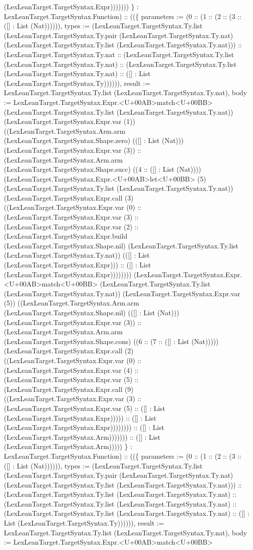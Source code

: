 \documentclass[11pt]{article}
\begin{document}
(LexLeanTarget.TargetSyntax.Expr))))))) \} : LexLeanTarget.TargetSyntax.Function) :: ((\{ parameters := (0 :: (1 :: (2 :: (3 :: ([] : List (Nat)))))), types := (LexLeanTarget.TargetSyntax.Ty.list (LexLeanTarget.TargetSyntax.Ty.pair (LexLeanTarget.TargetSyntax.Ty.nat) (LexLeanTarget.TargetSyntax.Ty.list (LexLeanTarget.TargetSyntax.Ty.nat))) :: (LexLeanTarget.TargetSyntax.Ty.nat :: (LexLeanTarget.TargetSyntax.Ty.list (LexLeanTarget.TargetSyntax.Ty.nat) :: (LexLeanTarget.TargetSyntax.Ty.list (LexLeanTarget.TargetSyntax.Ty.nat) :: ([] : List (LexLeanTarget.TargetSyntax.Ty)))))), result := LexLeanTarget.TargetSyntax.Ty.list (LexLeanTarget.TargetSyntax.Ty.nat), body := LexLeanTarget.TargetSyntax.Expr.<U+00AB>match<U+00BB> (LexLeanTarget.TargetSyntax.Ty.list (LexLeanTarget.TargetSyntax.Ty.nat)) (LexLeanTarget.TargetSyntax.Expr.var (1)) ((LexLeanTarget.TargetSyntax.Arm.arm (LexLeanTarget.TargetSyntax.Shape.zero) (([] : List (Nat))) (LexLeanTarget.TargetSyntax.Expr.var (3)) :: (LexLeanTarget.TargetSyntax.Arm.arm (LexLeanTarget.TargetSyntax.Shape.succ) ((4 :: ([] : List (Nat)))) (LexLeanTarget.TargetSyntax.Expr.<U+00AB>let<U+00BB> (5) (LexLeanTarget.TargetSyntax.Ty.list (LexLeanTarget.TargetSyntax.Ty.nat)) (LexLeanTarget.TargetSyntax.Expr.call (3) ((LexLeanTarget.TargetSyntax.Expr.var (0) :: (LexLeanTarget.TargetSyntax.Expr.var (3) :: (LexLeanTarget.TargetSyntax.Expr.var (2) :: (LexLeanTarget.TargetSyntax.Expr.build (LexLeanTarget.TargetSyntax.Shape.nil) (LexLeanTarget.TargetSyntax.Ty.list (LexLeanTarget.TargetSyntax.Ty.nat)) (([] : List (LexLeanTarget.TargetSyntax.Expr))) :: ([] : List (LexLeanTarget.TargetSyntax.Expr)))))))) (LexLeanTarget.TargetSyntax.Expr.<U+00AB>match<U+00BB> (LexLeanTarget.TargetSyntax.Ty.list (LexLeanTarget.TargetSyntax.Ty.nat)) (LexLeanTarget.TargetSyntax.Expr.var (5)) ((LexLeanTarget.TargetSyntax.Arm.arm (LexLeanTarget.TargetSyntax.Shape.nil) (([] : List (Nat))) (LexLeanTarget.TargetSyntax.Expr.var (3)) :: (LexLeanTarget.TargetSyntax.Arm.arm (LexLeanTarget.TargetSyntax.Shape.cons) ((6 :: (7 :: ([] : List (Nat))))) (LexLeanTarget.TargetSyntax.Expr.call (2) ((LexLeanTarget.TargetSyntax.Expr.var (0) :: (LexLeanTarget.TargetSyntax.Expr.var (4) :: (LexLeanTarget.TargetSyntax.Expr.var (5) :: (LexLeanTarget.TargetSyntax.Expr.call (9) ((LexLeanTarget.TargetSyntax.Expr.var (3) :: (LexLeanTarget.TargetSyntax.Expr.var (5) :: ([] : List (LexLeanTarget.TargetSyntax.Expr))))) :: ([] : List (LexLeanTarget.TargetSyntax.Expr)))))))) :: ([] : List (LexLeanTarget.TargetSyntax.Arm))))))) :: ([] : List (LexLeanTarget.TargetSyntax.Arm))))) \} : LexLeanTarget.TargetSyntax.Function) :: ((\{ parameters := (0 :: (1 :: (2 :: (3 :: ([] : List (Nat)))))), types := (LexLeanTarget.TargetSyntax.Ty.list (LexLeanTarget.TargetSyntax.Ty.pair (LexLeanTarget.TargetSyntax.Ty.nat) (LexLeanTarget.TargetSyntax.Ty.list (LexLeanTarget.TargetSyntax.Ty.nat))) :: (LexLeanTarget.TargetSyntax.Ty.list (LexLeanTarget.TargetSyntax.Ty.nat) :: (LexLeanTarget.TargetSyntax.Ty.list (LexLeanTarget.TargetSyntax.Ty.nat) :: (LexLeanTarget.TargetSyntax.Ty.list (LexLeanTarget.TargetSyntax.Ty.nat) :: ([] : List (LexLeanTarget.TargetSyntax.Ty)))))), result := LexLeanTarget.TargetSyntax.Ty.list (LexLeanTarget.TargetSyntax.Ty.nat), body := LexLeanTarget.TargetSyntax.Expr.<U+00AB>match<U+00BB> 
\end{document}
